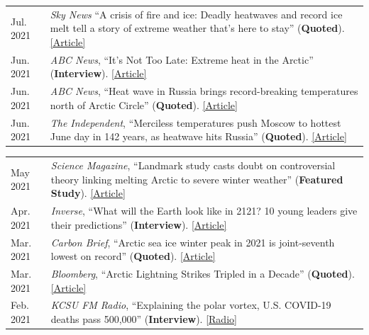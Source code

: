 \documentclass[margin,line,palatino,courier,10pt]{res}
\begin{document}
\begin{resume}
\begin{tabular}{@{}p{0.9in}p{4in}}
Jul. 2021 & \textit{Sky News} ``A crisis of fire and ice: Deadly heatwaves and record ice melt tell a story of extreme weather that’s here to stay'' (\textbf{Quoted}). \href{https://news.sky.com/story/climate-change-as-fire-rages-across-the-us-and-canada-ice-retreats-off-the-coast-of-siberia-12359277}{[Article]}\\
Jun. 2021 & \textit{ABC News}, ``It’s Not Too Late: Extreme heat in the Arctic'' (\textbf{Interview}). \href{https://abcnews.go.com/International/video/late-extreme-heat-arctic-78501037}{[Article]}\\
Jun. 2021 & \textit{ABC News}, ``Heat wave in Russia brings record-breaking temperatures north of Arctic Circle'' (\textbf{Quoted}). \href{https://abcnews.go.com/International/heat-wave-russia-brings-record-breaking-temperatures-north/story?id=78446355}{[Article]}\\
Jun. 2021 & \textit{The Independent}, ``Merciless temperatures push Moscow to hottest June day in 142 years, as heatwave hits Russia'' (\textbf{Quoted}). \href{https://www.independent.co.uk/climate-change/news/moscow-record-temperature-arctic-heatwave-b1871351.html}{[Article]}\\
\end{tabular}
\begin{tabular}{@{}p{0.9in}p{4in}}
May 2021 & \textit{Science Magazine}, ``Landmark study casts doubt on controversial theory linking melting Arctic to severe winter weather'' (\textbf{Featured Study}). \href{https://www.sciencemag.org/news/2021/05/landmark-study-casts-doubt-controversial-theory-linking-melting-arctic-severe-winter}{[Article]}\\
Apr. 2021 & \textit{Inverse}, ``What will the Earth look like in 2121? 10 young leaders give their predictions'' (\textbf{Interview}). \href{https://www.inverse.com/science/the-future-of-earth-needs-them}{[Article]}\\
Mar. 2021 & \textit{Carbon Brief}, ``Arctic sea ice winter peak in 2021 is joint-seventh lowest on record'' (\textbf{Quoted}). \href{https://www.carbonbrief.org/arctic-sea-ice-winter-peak-in-2021-is-joint-seventh-lowest-on-record}{[Article]}\\
Mar. 2021 & \textit{Bloomberg}, ``Arctic Lightning Strikes Tripled in a Decade'' (\textbf{Quoted}). \href{https://www.bloomberg.com/news/articles/2021-03-23/arctic-lightning-tripled-in-a-decade-climate-change-may-be-to-blame}{[Article]}\\
Feb. 2021 & \textit{KCSU FM Radio}, ``Explaining the polar vortex, U.S. COVID-19 deaths pass 500,000'' (\textbf{Interview}). \href{http://kcsufm.com/2021/02/explaining-the-polar-vortex-u-s-covid-19-deaths-pass-500000/}{[Radio]}\\

\end{tabular}
\end{resume}
\end{document}
